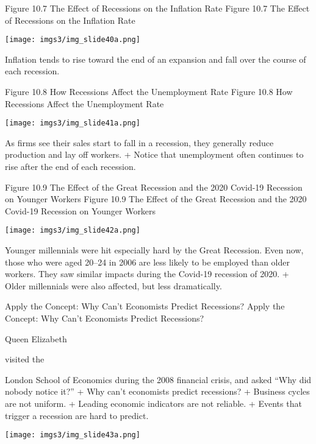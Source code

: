 \documentclass[
  12pt,
  ignorenonframetext,
]{beamer}
\begin{document}
\begin{frame}{Figure 10.7 The Effect of Recessions on the Inflation
Rate}
\protect\hypertarget{figure-10.7-the-effect-of-recessions-on-the-inflation-rate}{}
Figure 10.7 The Effect of Recessions on the Inflation Rate

\texttt{[image: imgs3/img\_slide40a.png]}

Inflation tends to rise toward the end of an expansion and fall over the
course of each recession.
\end{frame}

\begin{frame}{Figure 10.8 How Recessions Affect the Unemployment Rate}
\protect\hypertarget{figure-10.8-how-recessions-affect-the-unemployment-rate}{}
Figure 10.8 How Recessions Affect the Unemployment Rate

\texttt{[image: imgs3/img\_slide41a.png]}

As firms see their sales start to fall in a recession, they generally
reduce production and lay off workers. + Notice that unemployment often
continues to rise after the end of each recession.
\end{frame}

\begin{frame}{Figure 10.9 The Effect of the Great Recession and the 2020
Covid-19 Recession on Younger Workers}
\protect\hypertarget{figure-10.9-the-effect-of-the-great-recession-and-the-2020-covid-19-recession-on-younger-workers}{}
Figure 10.9 The Effect of the Great Recession and the 2020 Covid-19
Recession on Younger Workers

\texttt{[image: imgs3/img\_slide42a.png]}

Younger millennials were hit especially hard by the Great Recession.
Even now, those who were aged 20--24 in 2006 are less likely to be
employed than older workers. They saw similar impacts during the
Covid-19 recession of 2020. + Older millennials were also affected, but
less dramatically.
\end{frame}

\begin{frame}{Apply the Concept: Why Can't Economists Predict
Recessions?}
\protect\hypertarget{apply-the-concept-why-cant-economists-predict-recessions}{}
Apply the Concept: Why Can't Economists Predict Recessions?

Queen Elizabeth

visited the

London School of Economics during the 2008 financial crisis, and asked
``Why did nobody notice it?'' + Why can't economists predict recessions?
+ Business cycles are not uniform. + Leading economic indicators are not
reliable. + Events that trigger a recession are hard to predict.

\texttt{[image: imgs3/img\_slide43a.png]}
\end{frame}
\end{document}
